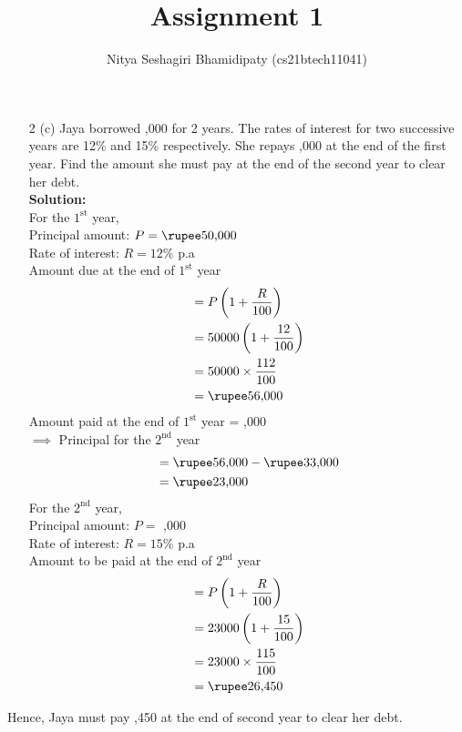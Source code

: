 \documentclass[journal,12pt,two column]{IEEEtran}
\title{Assignment 1}
\author{Nitya Seshagiri Bhamidipaty (cs21btech11041)}
\newcommand{\solution}{\noindent \textbf{Solution: }}
\begin{document}
\maketitle
\begin{enumerate}
\item[2 (c)] Jaya borrowed ,000 for 2 years. The rates of interest for two successive years are 12\% and 15\% respectively. She repays ,000 at the end of the first year. Find the amount she must pay at the end of the second year to clear her debt.\\
    \solution \\
For the $1^{\text{st}}$ year, \\
Principal amount: $P = \text{\rupee50,000}$\\
Rate of interest: $R = 12\%$ p.a \\
Amount due at the end of $1^{\text{st}}$ year 
\begin{align*}
    &= P\left(1 + \frac{R}{100}\right)
    \\
    &= 50000\left(1 + \frac{12}{100}\right)
    \\
    &= 50000\times \frac{112}{100}
    \\
    &= \text{\rupee56,000}
\end{align*}
Amount paid at the end of $1^{\text{st}}$ year = ,000\\
$\implies$ Principal for the $2^{\text{nd}}$ year
\begin{align*}
    &= \text{\rupee56,000} - \text{\rupee33,000}
    \\
    &= \text{\rupee23,000}
\end{align*}
For the $2^{\text{nd}}$ year,\\
Principal amount: $P =$ ,000\\
Rate of interest: $R = 15\%$ p.a \\
Amount to be paid at the end of $2^{\text{nd}}$ year
\begin{align*}
    &= P\left(1 + \frac{R}{100}\right)
    \\
    &= 23000\left(1 + \frac{15}{100}\right)
    \\
    &= 23000\times \frac{115}{100}
    \\
    &= \text{\rupee26,450}
\end{align*}
\end{enumerate}
Hence, Jaya must pay ,450 at the end of second year to clear her debt.
\end{document}
